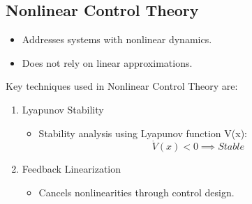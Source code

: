 \documentclass{article}
\begin{document}
\subsection{Nonlinear Control Theory}
\begin{itemize}
    \item Addresses systems with nonlinear dynamics.
    \item Does not rely on linear approximations.
\end{itemize}
Key techniques used in Nonlinear Control Theory are:
\begin{enumerate}
    \item Lyapunov Stability
        \begin{itemize}
            \item Stability analysis using Lyapunov function V(x):
                \[ \dot{V}(x) < 0 \implies Stable \]
        \end{itemize}
    \item Feedback Linearization
        \begin{itemize}
            \item Cancels nonlinearities through control design.
        \end{itemize}
\end{enumerate}
\end{document}
